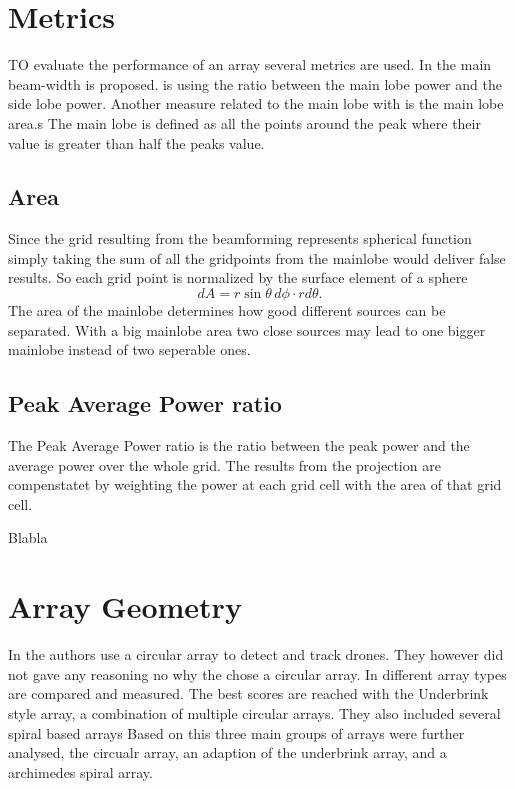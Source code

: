 \section{Metrics}
TO evaluate the performance of an array several metrics are used.
In  the
main beam-width is proposed.
 is using the ratio
between the main lobe power and the side lobe power.
Another measure related to the main lobe with is the main lobe area.s
The main lobe is defined as all the points around the peak where their value
is greater than half the peaks value. 

\subsection{Area}
Since the grid resulting from the beamforming represents spherical function
simply taking the sum of all the gridpoints from the mainlobe
would deliver false results.
So each grid point is normalized by the surface element of a sphere
\begin{equation}
	dA = r \sin\theta \, d\phi \cdot r d\theta.
\end{equation}
The area of the mainlobe determines how good different sources can be separated.
With a big mainlobe area two close sources may lead to one bigger mainlobe instead
of two seperable ones.
\subsection{Peak Average Power ratio}
The Peak Average Power ratio is the ratio between the peak power and
the average power over the whole grid.
The results from the projection are compenstatet by weighting
the power at each grid cell with the area of that grid cell.


Blabla
\section{Array Geometry}
In  the authors use a circular array to detect and track drones.
They however did not gave any reasoning no why the chose a circular array.
\cite{bandkProducts}
In \cite{arr1} different array types are compared and measured.
The best scores are reached with the Underbrink style array, a combination
of multiple circular arrays.
They also included several spiral based arrays
Based on this three main groups of arrays were further analysed,
the circualr array, an adaption of the underbrink array, and a archimedes
spiral array.
